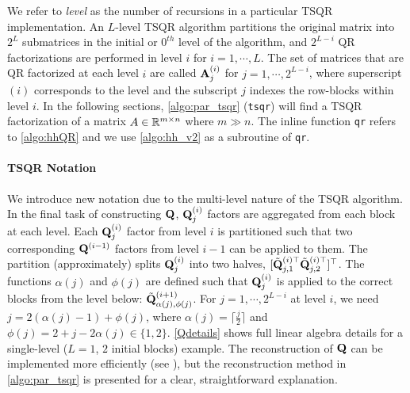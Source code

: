 We refer to \emph{level} as the number of recursions in a particular TSQR implementation. 
An $L$-level TSQR algorithm partitions the original matrix into $2^L$ submatrices in the initial or $0^{th}$ level of the algorithm, and $2^{L-i}$ QR factorizations are performed in level $i$ for $i = 1 , \cdots, L$. 
The set of matrices that are QR factorized at each level $i$ are called $\mathbf{A}_j^{(i)}$ for $j = 1, \cdots, 2^{L-i}$, where superscript $(i)$ corresponds to the level and the subscript $j$ indexes the row-blocks within level $i$.
In the following sections, \cref{algo:par_tsqr} ({\tt tsqr}) will find a TSQR factorization of a matrix $A\in\mathbb{R}^{m\times n}$ where $m \gg n$. 
The inline function {\tt qr} refers to \cref{algo:hhQR} and we use \cref{algo:hh_v2} as a subroutine of {\tt qr}.

\paragraph{TSQR Notation}
We introduce new notation due to the multi-level nature of the TSQR algorithm.
In the final task of constructing $\mathbf{Q}$, $\mathbf{Q}_j^{(i)}$ factors are aggregated from each block at each level.
Each $\mathbf{Q}_j^{(i)}$ factor from level $i$ is partitioned such that two corresponding $\mathbf{Q}^{(i-1)}$ factors from level $i-1$ can be applied to them. 
The partition (approximately) splits $\mathbf{Q}_{j}^{(i)}$ into two halves, $[\tilde{\mathbf{Q}}_{j, 1}^{(i)\top} \tilde{\mathbf{Q}}_{j, 2}^{(i)\top}]^{\top}$.
The functions $\alpha(j)$ and $\phi(j)$ are defined such that $\mathbf{Q}_j^{(i)}$ is applied to the correct blocks from the level below: $\tilde{\mathbf{Q}}_{\alpha(j), \phi(j)}^{(i+1)}$.
For $j = 1 , \cdots, 2^{L-i}$ at level $i$, we need $j = 2(\alpha(j)-1) + \phi(j)$, where $\alpha(j) = \lceil \frac{j}{2}\rceil$ and $\phi(j) = 2 + j - 2\alpha(j) \in\{1,2\}$.
\cref{Qdetails} shows full linear algebra details for a single-level ($L=1$, $2$ initial blocks) example.
The reconstruction of $\mathbf{Q}$ can be implemented more efficiently (see \cite{BDGJNS2014}), but the reconstruction method in \cref{algo:par_tsqr} is presented for a clear, straightforward explanation.
